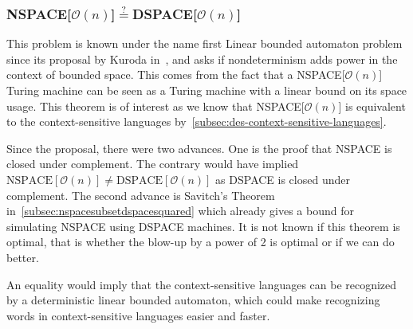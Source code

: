 \subsubsection{NSPACE[$\mathcal{O}(n)$]$\overset{?}{=}$DSPACE[$\mathcal{O}(n)$]}\label{subsubsec:nspacedspace}

This problem is known under the name first Linear bounded automaton problem since its proposal by Kuroda in~\cite{Kuroda1964}, and asks if nondeterminism adds power in the context of bounded space.
This comes from the fact that a NSPACE[$\mathcal{O}(n)$] Turing machine can be seen as a Turing machine with a linear bound on its space usage.
This theorem is of interest as we know that NSPACE[$\mathcal{O}(n)$] is equivalent to the context-sensitive languages by~\cref{subsec:des-context-sensitive-languages}.

Since the proposal, there were two advances.
One is the proof that NSPACE is closed under complement.
The contrary would have implied $\text{NSPACE}[\mathcal{O}(n)] \neq \text{DSPACE}[\mathcal{O}(n)]$ as DSPACE is closed under complement.
The second advance is Savitch's Theorem in~\cref{subsec:nspacesubsetdspacesquared} which already gives a bound for simulating NSPACE using DSPACE machines.
It is not known if this theorem is optimal, that is whether the blow-up by a power of 2 is optimal or if we can do better.

An equality would imply that the context-sensitive languages can be recognized by a deterministic linear bounded automaton, which could make recognizing words in context-sensitive languages easier and faster.